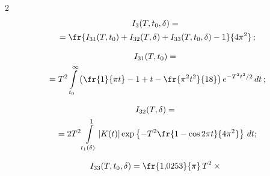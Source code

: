 \begin{multicols}{2}
\begin{multline*}
I_3(T,t_0,\delta)={}\\


{}= \fr{I_{31}(T,t_0)+


I_{32}(T,\delta)+I_{33}(T,t_0,\delta)-1}{4\pi^2}\,;


\end{multline*}





\vspace*{-12pt}





\noindent


\begin{multline*}


I_{31}(T,t_0)={}\\


{}=


T^2\int\limits_{t_0}^{\infty}{\left(\fr{1}{\pi t}


-1+t-\fr{\pi^2t^2}{18}\right)e^{-T^2t^2/2}\,dt}\,;


\end{multline*}





\vspace*{-12pt}





\noindent


\begin{multline*}


I_{32}(T,\delta)={}\\


{}=


2T^2\int\limits_{t_1(\delta)}^1\left|K(t)\right|


\exp\left\{-T^2\fr{1-\cos 2\pi t}{4\pi^2}\right\} \,dt;


\end{multline*}





\vspace*{-12pt}





\noindent


\begin{multline*}


I_{33}(T,t_0,\delta)=\fr{1{,}0253}{\pi}\, T^2\times{}\\



\end{multline*}
\end{multicols}

